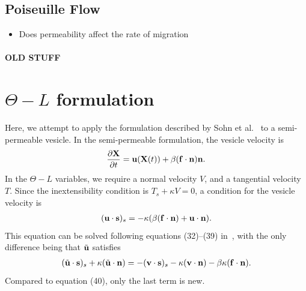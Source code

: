 \documentclass[aps,prl,showpacs]{revtex4}
\newif\ifTikz
\begin{document}
\ifTikz

\fi

\subsection{Poiseuille Flow}
\begin{itemize}
  \item Does permeability affect the rate of migration
\end{itemize}



 
 




 \newpage
 \paragraph{\bf \Huge OLD STUFF}

\section{{$\Theta-L$} formulation}
Here, we attempt to apply the formulation described by Sohn et
al.~\cite{soh-tse-li-voi-low2010} to a semi-permeable vesicle.  In the
semi-permeable formulation, the vesicle velocity is
\begin{align}
  \frac{\partial \mathbf{X}}{\partial t} = \mathbf{u}(\mathbf{X}(t)) + \beta (\mathbf{f} \cdot \mathbf{n}) \mathbf{n}.
\end{align}
In the {$\Theta-L$} variables, we require a normal velocity $V$, and a
tangential velocity $T$. Since the inextensibility condition is $T_s +
\kappa V = 0$, a condition for the vesicle velocity is
\begin{align}
  (\mathbf{u} \cdot \mathbf{s})_s = -\kappa(\beta (\mathbf{f} \cdot \mathbf{n}) + 
      \mathbf{u} \cdot \mathbf{n}).
\end{align}
This equation can be solved following equations (32)--(39)
in~\cite{soh-tse-li-voi-low2010}, with the only difference being that
$\tilde{\mathbf{u}}$ satisfies
\begin{align}
  (\tilde{\mathbf{u}} \cdot \mathbf{s})_s + \kappa(\tilde{\mathbf{u}} \cdot \mathbf{n}) =
    -(\mathbf{v} \cdot \mathbf{s})_s - \kappa(\mathbf{v} \cdot \mathbf{n}) 
    - \beta\kappa(\mathbf{f} \cdot \mathbf{n}).
\end{align}
Compared to equation (40), only the last term is new.
\end{document}
